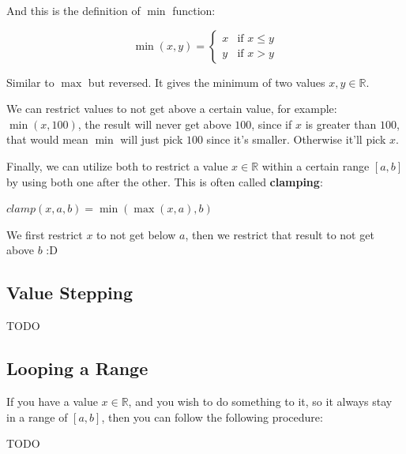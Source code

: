 \sgap

\begin{samepage}
    And this is the definition of $\min$ function:
    \begin{center}
        \[
            \min(x, y) =
            \begin{cases}
                x & \text{if } x \leq y \\
                y & \text{if } x > y
            \end{cases}
        \]
    \end{center}
\end{samepage}

Similar to $\max$ but reversed. It gives the minimum of two values $x, y \in \mathbb{R}$.

We can restrict values to not get above a certain value, for example:
$\min(x, 100)$, the result will never get above $100$, since if $x$ is greater than $100$, that would mean
$\min$ will just pick $100$ since it's smaller. Otherwise it'll pick $x$.


\sgap
Finally, we can utilize both to restrict a value $x \in \mathbb{R}$ within a certain range $[a, b]$ by using both one after the other.
This is often called \textbf{clamping}:
\begin{center}
    $clamp(x, a, b) = \min(\max(x, a), b)$
\end{center}

We first restrict $x$ to not get below $a$, then we restrict that result to not get above $b$ :D


\subsection{Value Stepping}
TODO


\subsection{Looping a Range}
If you have a value $x \in \mathbb{R}$, and you wish to do something to it, so it always stay in a range of $[a, b]$,
then you can follow the following procedure:

TODO





